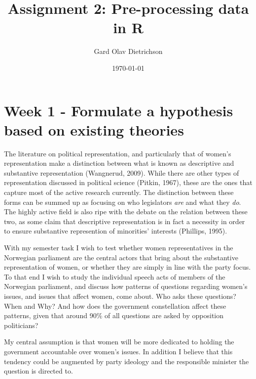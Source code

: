 \documentclass[12pt]{article}
\title{Assignment 2: Pre-processing data in R}
\author{Gard Olav Dietrichson}
\date{\today}
\begin{document}
	\maketitle
	
	\section{Week 1 - Formulate a hypothesis based on existing theories}
	The literature on political representation, and particularly that of women's representation make a distinction between what is known as descriptive and substantive representation (Wangnerud, 2009). While there are other types of representation discussed in political science (Pitkin, 1967), these are the ones that capture most of the active research currently. The distinction between these forms can be summed up as focusing on who legislators \textit{are} and what they \textit{do}. The highly active field is also ripe with the debate on the relation between these two, as some claim that descriptive representation is in fact a necessity in order to ensure substantive represention of minorities' interests (Phillips, 1995).
	
	With my semester task I wish to test whether women representatives in the Norwegian parliament are the central actors that bring about the substantive representation of women, or whether they are simply in line with the party focus. To that end I wish to study the individual speech acts of members of the Norwegian parliament, and discuss how patterns of questions regarding women's issues, and issues that affect women, come about. Who asks these questions? When and Why? And how does the government constellation affect these patterns, given that around 90\% of all questions are asked by opposition politicians?
	
	My central assumption is that women will be more dedicated to holding the government accountable over women's issues. In addition I believe that this tendency could be augmented by party ideology and the responsible minister the question is directed to. 
	
\end{document}
